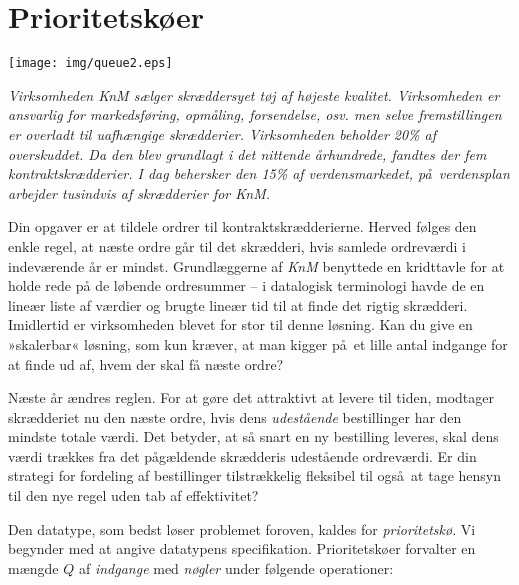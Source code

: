 \chapter{Prioritetskøer}
\label{ch:pq}
\vspace*{-4.5cm}
\begin{flushright}
\texttt{[image: img/queue2.eps]}
\end{flushright}
\vspace*{1cm}

\noindent
{\itshape
Virksomheden \emph{KnM} sælger skræddersyet tøj af højeste kvalitet.
Virksomheden er ansvarlig for markedsføring, opmåling, forsendelse, osv. men selve fremstillingen er overladt til uafhængige skrædderier.
Virksomheden beholder 20\% af overskuddet.
Da den blev grundlagt i det nittende århundrede, fandtes der fem kontraktskrædderier.
I dag behersker den 15\% af verdensmarkedet, på verdensplan arbejder tusindvis af skrædderier for \emph{KnM}.

Din opgaver er at tildele ordrer til kontraktskrædderierne.
Herved følges den enkle regel, at næste ordre går til det skrædderi, hvis samlede ordreværdi i indeværende år er mindst.
Grundlæggerne af \emph{KnM} benyttede en kridttavle for at holde rede på de løbende ordresummer -- i datalogisk terminologi havde de en lineær liste af værdier og brugte lineær tid til at finde det rigtig skrædderi.
Imidlertid er virksomheden blevet for stor til denne løsning.
Kan du give en »skalerbar« løsning, som kun kræver, at man kigger på et lille antal indgange for at finde ud af, hvem der skal få næste ordre?

Næste år ændres reglen.
For at gøre det attraktivt at levere til tiden, modtager skrædderiet nu den næste ordre, hvis dens \emph{udestående} bestillinger har den mindste totale værdi.
Det betyder, at så snart en ny bestilling leveres, skal dens værdi trækkes fra det pågældende skrædderis udestående ordreværdi.
Er din strategi for fordeling af bestillinger tilstrækkelig fleksibel til også at tage hensyn til den nye regel uden tab af effektivitet?
}

\setcounter{footnote}{1}

\bigskip\noindent
Den datatype,
som bedst løser problemet foroven, kaldes for \emph{prioritetskø}.
Vi begynder med at angive datatypens specifikation.
Prioritetskøer forvalter en mængde $Q$ af \emph{indgange} med \emph{nøgler}
under følgende operationer:

